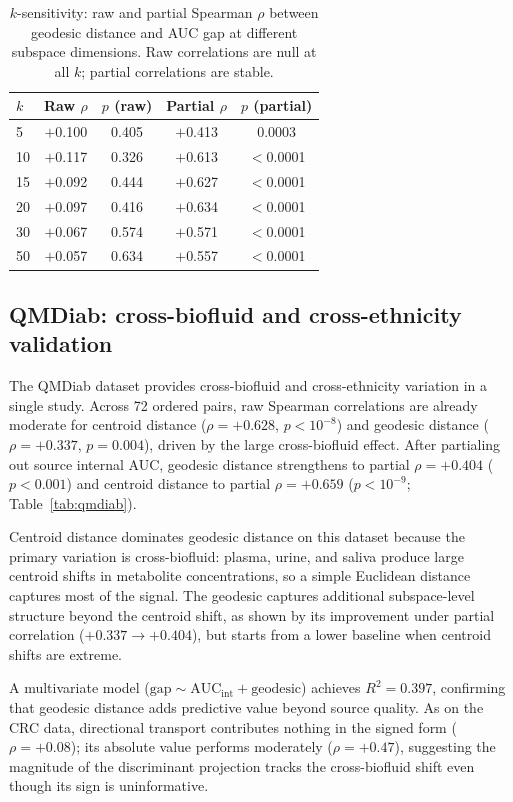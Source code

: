 \documentclass{article}
\begin{document}
\begin{table}[t]
\centering
\caption{$k$-sensitivity: raw and partial Spearman $\rho$ between geodesic distance and AUC gap at different subspace dimensions. Raw correlations are null at all $k$; partial correlations are stable.}
\label{tab:ksens}
\begin{tabular}{lcccc}
\toprule
$k$ & Raw $\rho$ & $p$ (raw) & Partial $\rho$ & $p$ (partial) \\
\midrule
5  & $+$0.100 & 0.405 & $+$0.413 & 0.0003 \\
10 & $+$0.117 & 0.326 & $+$0.613 & $<$0.0001 \\
15 & $+$0.092 & 0.444 & $+$0.627 & $<$0.0001 \\
20 & $+$0.097 & 0.416 & $+$0.634 & $<$0.0001 \\
30 & $+$0.067 & 0.574 & $+$0.571 & $<$0.0001 \\
50 & $+$0.057 & 0.634 & $+$0.557 & $<$0.0001 \\
\bottomrule
\end{tabular}
\end{table}


\subsection{QMDiab: cross-biofluid and cross-ethnicity validation}
\label{sec:qmdiab}

The QMDiab dataset provides cross-biofluid and cross-ethnicity variation in a single study. Across 72 ordered pairs, raw Spearman correlations are already moderate for centroid distance ($\rho = +0.628$, $p < 10^{-8}$) and geodesic distance ($\rho = +0.337$, $p = 0.004$), driven by the large cross-biofluid effect. After partialing out source internal AUC, geodesic distance strengthens to partial $\rho = +0.404$ ($p < 0.001$) and centroid distance to partial $\rho = +0.659$ ($p < 10^{-9}$; Table~\ref{tab:qmdiab}).

Centroid distance dominates geodesic distance on this dataset because the primary variation is cross-biofluid: plasma, urine, and saliva produce large centroid shifts in metabolite concentrations, so a simple Euclidean distance captures most of the signal. The geodesic captures additional subspace-level structure beyond the centroid shift, as shown by its improvement under partial correlation ($+0.337 \to +0.404$), but starts from a lower baseline when centroid shifts are extreme.

A multivariate model ($\text{gap} \sim \text{AUC}_{\mathrm{int}} + \text{geodesic}$) achieves $R^2 = 0.397$, confirming that geodesic distance adds predictive value beyond source quality. As on the CRC data, directional transport contributes nothing in the signed form ($\rho = +0.08$); its absolute value performs moderately ($\rho = +0.47$), suggesting the magnitude of the discriminant projection tracks the cross-biofluid shift even though its sign is uninformative.
\end{document}
